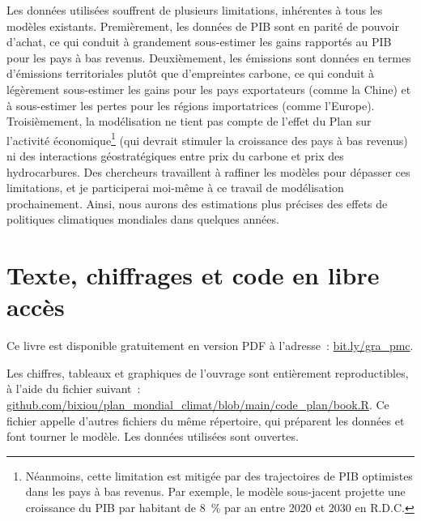 \documentclass[a5paper,french,openany]{memoir}
\begin{document}
Les données utilisées souffrent de plusieurs limitations, inhérentes à tous les modèles existants. Premièrement, les données de PIB sont en parité de pouvoir d'achat, ce qui conduit à grandement sous-estimer les gains rapportés au PIB pour les pays à bas revenus. Deuxièmement, les émissions sont données en termes d'émissions territoriales plutôt que d'empreintes carbone, ce qui conduit à légèrement sous-estimer les gains pour les pays exportateurs (comme la Chine) et à sous-estimer les pertes pour les régions importatrices (comme l'Europe). 
Troisièmement, la modélisation ne tient pas compte de l'effet du Plan sur l'activité économique\footnote{Néanmoins, cette limitation est mitigée par des trajectoires de PIB optimistes dans les pays à bas revenus. Par exemple, le modèle sous-jacent projette une croissance du PIB par habitant de 8~\% par an entre 2020 et 2030 en R.D.C.} (qui devrait stimuler la croissance des pays à bas revenus) ni des interactions géostratégiques entre prix du carbone et prix des hydrocarbures. Des chercheurs travaillent à raffiner les modèles pour dépasser ces limitations, et je participerai moi-même à ce travail de modélisation prochainement. Ainsi, nous aurons des estimations plus précises des effets de politiques climatiques mondiales dans quelques années. %

\section{Texte, chiffrages et code en libre accès}

Ce livre est disponible gratuitement en version PDF à l'adresse~: \href{https://global-redistribution-advocates.org/fr/un-plan-mondial-pour-le-climat-et-contre-lextreme-pauvrete/}{bit.ly/gra\_pmc}. %

Les chiffres, tableaux et graphiques de l'ouvrage sont entièrement reproductibles, à l'aide du fichier suivant~:\\ \href{https://github.com/bixiou/plan_mondial_climat/blob/main/code_plan/book.R}{github.com/bixiou/plan\_mondial\_climat/blob/main/code\_plan/book.R}. Ce fichier appelle d'autres fichiers du même répertoire, qui préparent les données et font tourner le modèle. Les données utilisées sont ouvertes.
\end{document}
